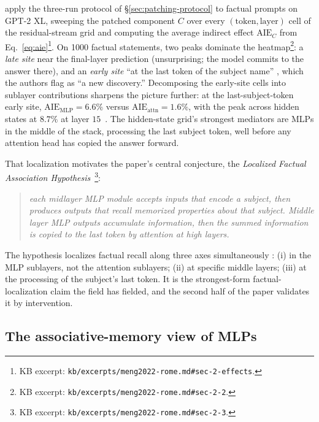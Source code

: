 \citet{meng2022-rome} apply the three-run protocol of
\S\ref{sec:patching-protocol} to factual prompts on GPT-2 XL,
sweeping the patched component $C$ over every $(\text{token}, \text{layer})$
cell of the residual-stream grid and computing the average indirect
effect $\mathrm{AIE}_C$ from
Eq.~\eqref{eq:aie}\footnote{KB excerpt:
\texttt{kb/excerpts/meng2022-rome.md\#sec-2-effects}.}. On 1000 factual
statements, two peaks dominate the
heatmap\footnote{KB excerpt:
\texttt{kb/excerpts/meng2022-rome.md\#sec-2-2}.}: a \emph{late site}
near the final-layer prediction (unsurprising; the model commits to
the answer there), and an \emph{early site} ``at the last token of
the subject name'' \citep[\S 2.2]{meng2022-rome}, which the authors
flag as ``a new discovery.'' Decomposing the early-site cells into
sublayer contributions sharpens the picture further: at the
last-subject-token early site, $\mathrm{AIE}_{\mathrm{MLP}} = 6.6\%$
versus $\mathrm{AIE}_{\mathrm{attn}} = 1.6\%$, with the  peak
across hidden states at $8.7\%$ at layer
$15$~\citep[\S 2.2]{meng2022-rome}. The hidden-state grid's strongest
mediators are MLPs in the middle of the stack, processing the last
subject token, well before any attention head has copied the answer
forward.

That localization motivates the paper's central conjecture, the
\emph{Localized Factual Association Hypothesis}~\citep[\S
2.3]{meng2022-rome}\footnote{KB excerpt:
\texttt{kb/excerpts/meng2022-rome.md\#sec-2-3}.}:

\begin{quote}
\itshape
each midlayer MLP module accepts inputs that encode a subject, then
produces outputs that recall memorized properties about that subject.
Middle layer MLP outputs accumulate information, then the summed
information is copied to the last token by attention at high layers.
\end{quote}

\noindent
The hypothesis localizes factual recall along three axes simultaneously
\citep[\S 2.3]{meng2022-rome}: (i) in the MLP sublayers, not the
attention sublayers; (ii) at specific middle layers; (iii) at the
processing of the subject's last token. It is the strongest-form
factual-localization claim the field has fielded, and the second half
of the paper validates it by intervention.

\subsection{The associative-memory view of MLPs}
\label{sec:rome-memory}

